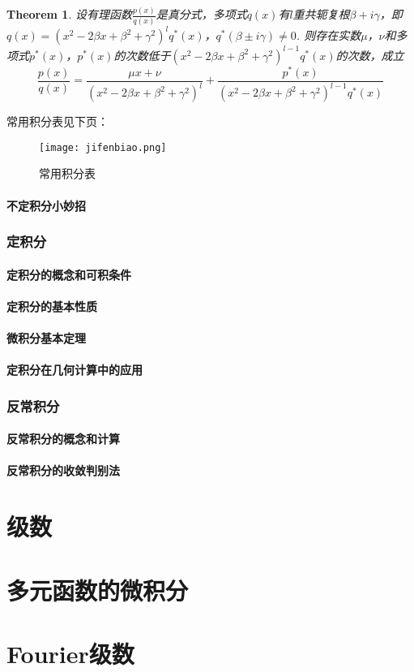 \documentclass[9pt]{ctexart}
\newtheorem{theorem}{Theorem}[section]
\begin{document}
\begin{theorem}
    设有理函数$\frac{p(x)}{q(x)}$是真分式，多项式$q(x)$有$l$重共轭复根$\beta+i\gamma$，即$q(x)=(x^2-2\beta x+\beta^2+\gamma^2)^l q^*(x)$，$q^*(\beta\pm i\gamma)\neq 0$. 则存在实数$\mu$，$\nu$和多项式$p^*(x)$，$p^*(x)$的次数低于$(x^2-2\beta x+\beta^2+\gamma^2)^{l-1} q^*(x)$的次数，成立
    \[\frac{p(x)}{q(x)}=\frac{\mu x+\nu}{(x^2-2\beta x+\beta^2+\gamma^2)^l}+\frac{p^*(x)}{(x^2-2\beta x+\beta^2+\gamma^2)^{l-1} q^*(x)}\]
\end{theorem}
\par{常用积分表见下页：}
\begin{figure}[htbp]
    \centering
    \texttt{[image: jifenbiao.png]}
    \caption{常用积分表}
\end{figure}
\newpage
\subsection{不定积分小妙招}
\section{定积分}
\subsection{定积分的概念和可积条件}
\subsection{定积分的基本性质}
\subsection{微积分基本定理}
\subsection{定积分在几何计算中的应用}
\section{反常积分}
\subsection{反常积分的概念和计算}
\subsection{反常积分的收敛判别法}



















\newpage
\part{级数}
\newpage
\part{多元函数的微积分}
\newpage
\part{Fourier级数}
\end{document}
